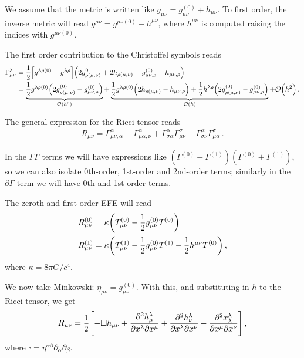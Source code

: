 \documentclass[main.tex]{subfiles}
\begin{document}
We assume that the metric is written like \(g_{\mu \nu } = g_{\mu \nu }^{(0)} + h_{\mu \nu }\). 
To first order, the inverse metric will read \(g^{\mu \nu }= g^{\mu \nu (0)} - h^{\mu \nu }\), where \(h^{\mu \nu }\) is computed raising the indices with \(g^{\mu \nu (0)}\). 

The first order contribution to the Christoffel symbols reads 
%
\begin{align}
\Gamma^{\lambda }_{\mu \nu } &= \frac{1}{2} \qty[g^{\lambda \rho (0)} - g^{\lambda \rho }] \qty(2 g^{0}_{\rho (\mu , \nu )} + 2 h_{\rho (\mu , \nu )}- g^{(0)}_{\mu \nu , \rho } - h_{\mu \nu , \rho })
\\
&= \underbrace{\frac{1}{2} g^{\lambda \rho (0)} \qty(2g^{(0)}_{\rho (\mu , \nu )} - g^{(0)}_{\mu \nu , \rho })}_{\order{h^{0}}} +
\underbrace{\frac{1}{2} g^{\lambda \rho (0)} \qty(2h_{\rho (\mu , \nu )} - h_{\mu \nu , \rho }) + 
\frac{1}{2} h^{\lambda \rho } \qty(2g^{(0)}_{\rho (\mu , \nu )} - g^{(0)}_{\mu \nu , \rho })}_{\order{h}} + \order{h^2}
\,.
\end{align}

The general expression for the Ricci tensor reads 
%
\begin{align}
R_{\mu \nu } = \Gamma^{\alpha }_{\mu \nu , \alpha } - \Gamma^{\alpha }_{\mu \alpha , \nu } + \Gamma^{\alpha }_{\sigma \alpha } \Gamma^{\sigma }_{\mu \nu } - \Gamma^{\alpha }_{\sigma \nu } \Gamma^{\sigma }_{\mu \alpha}
\,.
\end{align}

In the \(\Gamma \Gamma \) terms we will have expressions like \((\Gamma^{(0)} + \Gamma^{(1)}) (\Gamma^{(0)} + \Gamma^{(1)})\), so we can also isolate 0th-order, 1st-order and 2nd-order terms; 
similarly in the \(\partial \Gamma \) term we will have 0th and 1st-order terms. 

The zeroth and first order EFE will read 
%
\begin{align}
R^{(0)}_{\mu \nu } &= \kappa  \qty(T_{\mu \nu }^{(0)} - \frac{1}{2} g_{\mu \nu }^{(0)} T^{(0)}) \\
R^{(1)}_{\mu \nu } &= \kappa  \qty(T_{\mu \nu }^{(1)} - \frac{1}{2} g_{\mu \nu }^{(0)} T^{(1)} - \frac{1}{2} h^{\mu \nu } T^{(0)})
\,,
\end{align}
%
where \(\kappa = 8 \pi G / c^{4}\). 

We now take Minkowski: \(\eta_{\mu \nu } = g_{\mu \nu }^{(0)}\). 
With this, and substituting in \(h\) to the Ricci tensor, we get 
%
\begin{align}
R_{\mu \nu } = \frac{1}{2} \qty[ - \square h_{\mu \nu } + \pdv{h^{\lambda }_{\mu }}{x^{\lambda }}{x^{\mu }} + \pdv{h^{\lambda }_{\nu }}{x^{\lambda }}{x^{\nu }} - \pdv{x^{\lambda }_{\lambda }}{x^{\mu }}{x^{\nu }}]
\,,
\end{align}
%
where \(\square = \eta^{\alpha \beta } \partial_{\alpha }\partial_{\beta }\). 
\end{document}
